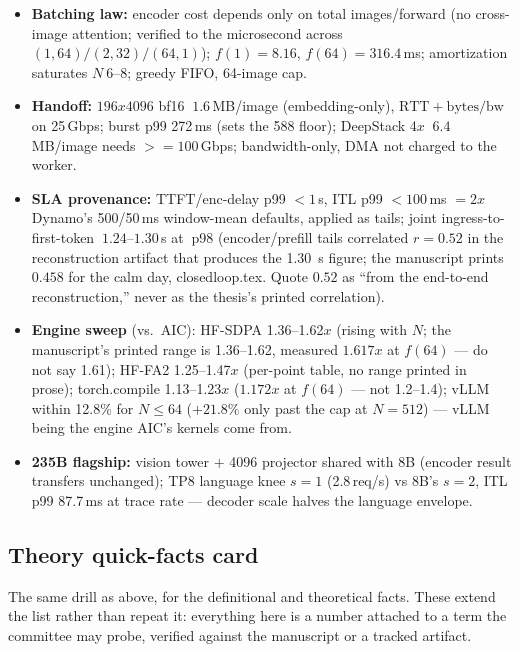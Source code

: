 \documentclass[11pt,a4paper]{article}
\def\times{x}\def\rho{rho}\def\approx{~}\def\leq{<=}\def\geq{>=}%
\def\emph#1{#1}\def\texttt#1{#1}%
\begin{document}
\begin{itemize}
\item \textbf{Batching law:} encoder cost depends only on total
  images/forward (no cross-image attention; verified to the microsecond
  across $(1,64)/(2,32)/(64,1)$); $f(1){=}8.16$, $f(64){=}316.4$\,ms;
  amortization saturates $N{\approx}6$--$8$; greedy FIFO, 64-image cap.
\item \textbf{Handoff:} $196{\times}4096$ bf16 ${\approx}1.6$\,MB/image
  (embedding-only), $\text{RTT}{+}\text{bytes}/\text{bw}$ on 25\,Gbps; burst
  p99 272\,ms (sets the 588 floor); DeepStack $4\times$
  ${\approx}6.4$\,MB/image needs ${\geq}100$\,Gbps; bandwidth-only, DMA not
  charged to the worker.
\item \textbf{SLA provenance:} TTFT/enc-delay p99 $<1$\,s, ITL p99
  $<100$\,ms $= 2\times$ Dynamo's 500/50\,ms window-mean defaults, applied
  as tails; joint ingress-to-first-token ${\approx}1.24$--$1.30$\,s at
  ${\approx}$p98 (encoder/prefill tails correlated $r{=}0.52$ in the
  reconstruction artifact that produces the \SI{1.30}{\second} figure; the
  \emph{manuscript} prints $0.458$ for the calm day, \texttt{closedloop.tex}.
  Quote $0.52$ as ``from the end-to-end reconstruction,'' never as the
  thesis's printed correlation).
\item \textbf{Engine sweep} (vs.\ AIC): HF-SDPA 1.36--1.62$\times$ (rising
  with $N$; the manuscript's printed range is 1.36--1.62, measured
  $1.617\times$ at $f(64)$ --- do not say 1.61); HF-FA2 1.25--1.47$\times$
  (per-point table, no range printed in prose); \texttt{torch.compile}
  1.13--1.23$\times$ ($1.172\times$ at $f(64)$ --- \emph{not} 1.2--1.4);
  vLLM within 12.8\% for $N{\le}64$ ($+21.8\%$ only past
  the cap at $N{=}512$) --- vLLM being the engine AIC's kernels come from.
\item \textbf{235B flagship:} vision tower $+$ 4096 projector shared with 8B
  (encoder result transfers unchanged); TP8 language knee $s{=}1$
  (2.8\,req/s) vs 8B's $s{=}2$, ITL p99 87.7\,ms at trace rate --- decoder
  scale halves the language envelope.
\end{itemize}

\subsection*{Theory quick-facts card}

The same drill as above, for the definitional and theoretical facts. These
extend the list rather than repeat it: everything here is a number attached
to a \emph{term} the committee may probe, verified against the manuscript or
a tracked artifact.
\end{document}
